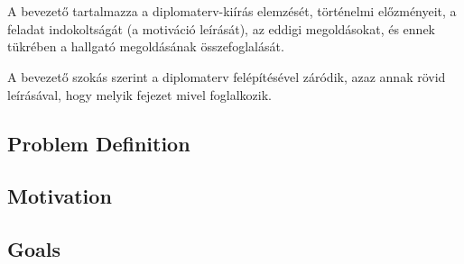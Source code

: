 \chapter{\bevezetes}

A bevezető tartalmazza a diplomaterv-kiírás elemzését, történelmi előzményeit, a feladat indokoltságát (a motiváció leírását), az eddigi megoldásokat, és ennek tükrében a hallgató megoldásának összefoglalását.

A bevezető szokás szerint a diplomaterv felépítésével záródik, azaz annak rövid leírásával, hogy melyik fejezet mivel foglalkozik.

\section{Problem Definition}

\section{Motivation}

\section{Goals}

